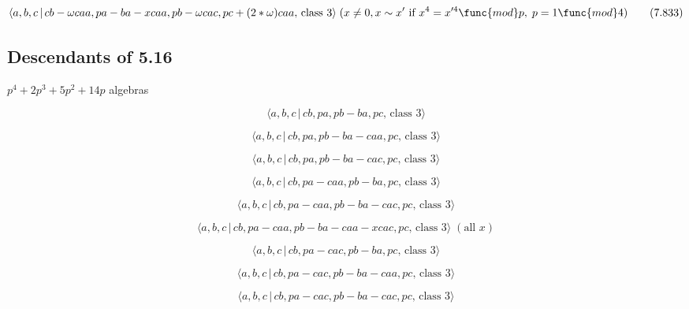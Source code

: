 \documentclass[10pt]{article}
\begin{document}
\begin{equation}
\langle a,b,c\,|\,cb-\omega caa,pa-ba-xcaa,pb-\omega cac,pc+(2\ast \omega
)caa,\,\text{class }3\rangle \;(x\neq 0,x\sim x^{\prime}\text{ if }%
x^4=x^{\prime 4}\func{mod}p,\;p=1\func{mod}4)  \tag{7.833}
\end{equation}

\subsection{Descendants of 5.16}

$p^{4}+2p^{3}+5p^{2}+14p$ algebras

\begin{equation}
\langle a,b,c\,|\,cb,pa,pb-ba,pc,\,\text{class }3\rangle  \tag{7.834}
\end{equation}

\begin{equation}
\langle a,b,c\,|\,cb,pa,pb-ba-caa,pc,\,\text{class }3\rangle  \tag{7.835}
\end{equation}

\begin{equation}
\langle a,b,c\,|\,cb,pa,pb-ba-cac,pc,\,\text{class }3\rangle  \tag{7.836}
\end{equation}

\begin{equation}
\langle a,b,c\,|\,cb,pa-caa,pb-ba,pc,\,\text{class }3\rangle  \tag{7.837}
\end{equation}

\begin{equation}
\langle a,b,c\,|\,cb,pa-caa,pb-ba-cac,pc,\,\text{class }3\rangle  \tag{7.838}
\end{equation}

\begin{equation}
\langle a,b,c\,|\,cb,pa-caa,pb-ba-caa-xcac,pc,\,\text{class }3\rangle \;(%
\text{all }x)  \tag{7.839}
\end{equation}

\begin{equation}
\langle a,b,c\,|\,cb,pa-cac,pb-ba,pc,\,\text{class }3\rangle  \tag{7.840}
\end{equation}

\begin{equation}
\langle a,b,c\,|\,cb,pa-cac,pb-ba-caa,pc,\,\text{class }3\rangle  \tag{7.841}
\end{equation}

\begin{equation}
\langle a,b,c\,|\,cb,pa-cac,pb-ba-cac,pc,\,\text{class }3\rangle  \tag{7.842}
\end{equation}
\end{document}
